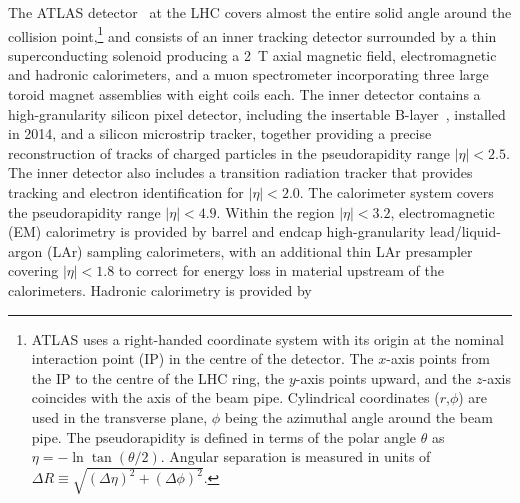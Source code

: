 \documentclass[PAPER, coverpage, atlasdraft=true, texlive=2016, UKenglish]{\ATLASLATEXPATH atlasdoc}
\providecommand{\DIFadd}[1]{{\protect\color{blue}\uwave{#1}}} %
\providecommand{\DIFaddbegin}{} %
\providecommand{\DIFaddend}{} %
\begin{document}
The ATLAS detector~\cite{PERF-2007-01} at the LHC covers almost the entire solid angle around the collision point,\footnote{ATLAS 
uses a right-handed coordinate system with its origin at the nominal interaction point (IP) in the 
centre of the detector.  
The $x$-axis points from
the IP to the centre of the LHC ring, %
the $y$-axis points upward,
and the $z$-axis coincides with the axis of the beam pipe.
Cylindrical coordinates ($r$,$\phi$) are used 
in the transverse plane, $\phi$ being the azimuthal angle around the beam pipe. The pseudorapidity is defined in 
terms of the polar angle $\theta$ as $\eta = - \ln \tan(\theta/2)$.
Angular separation is measured in units of $\Delta R\equiv \sqrt{(\Delta\eta)^2+(\Delta\phi)^2}$.} and \DIFaddbegin \DIFadd{it }\DIFaddend consists of an inner tracking detector surrounded by a thin superconducting solenoid producing a
2~T axial magnetic field, electromagnetic and hadronic calorimeters, and a muon spectrometer incorporating three large toroid magnet assemblies with eight coils each. The inner detector contains a high-granularity silicon pixel detector, including the %
insertable B-layer~\cite{IBL1,IBL2,Abbott:2018ikt}, installed in 2014, and a silicon microstrip tracker, together providing a precise reconstruction of tracks of charged particles in the pseudorapidity range $|\eta|<2.5$.
The inner detector also includes a transition radiation tracker that provides tracking and electron identification for $|\eta|<2.0$.
The calorimeter system covers the pseudorapidity range $|\eta| < 4.9$. Within the region $|\eta|< 3.2$, electromagnetic (EM) calorimetry is provided by barrel and endcap high-granularity lead/liquid-argon (LAr) sampling calorimeters, with an additional thin LAr presampler covering $|\eta| < 1.8$ to correct for energy loss in material upstream of the calorimeters. Hadronic calorimetry is provided by %
\end{document}
